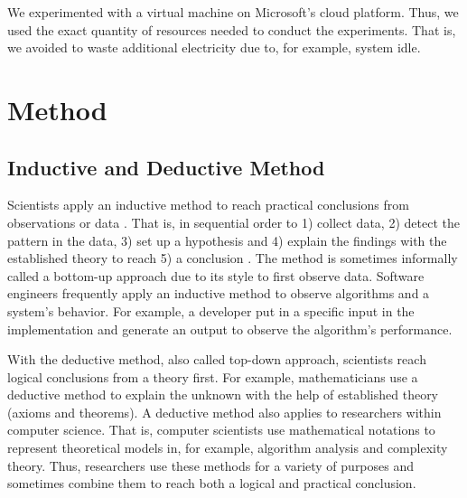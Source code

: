 \documentclass[a4paper,11pt]{kth-mag}
\newcommand*{\skippara}{\par\vspace{\baselineskip} \noindent}
\begin{document}
\skippara We experimented with a virtual machine on Microsoft's cloud platform.
Thus, we used the exact quantity of resources needed to conduct the experiments.
That is, we avoided to waste additional electricity due to, for example, system idle.



\clearpage

%
\section{Method}\label{sec:methods}

\subsection{Inductive and Deductive Method}
Scientists apply an inductive method to reach practical conclusions from observations or data \cite{Omexperi69:online}.
That is, in sequential order to 1) collect data, 2) detect the pattern in the data, 3) set up a hypothesis and 4) explain the findings with the established theory to reach 5) a conclusion \cite{web:induction}.
The method is sometimes informally called a bottom-up approach due to its style to first observe data.
Software engineers frequently apply an inductive method to observe algorithms and a system's behavior.
For example, a developer put in a specific input in the implementation and generate an output to observe the algorithm's performance.

\skippara With the deductive method, also called top-down approach, scientists reach logical conclusions from a theory first.
For example, mathematicians use a deductive method to explain the unknown with the help of established theory (axioms and theorems).
A deductive method also applies to researchers within computer science.
That is, computer scientists use mathematical notations to represent theoretical models in, for example, algorithm analysis and complexity theory.
Thus, researchers use these methods for a variety of purposes and sometimes combine them to reach both a logical and practical conclusion.
\end{document}

